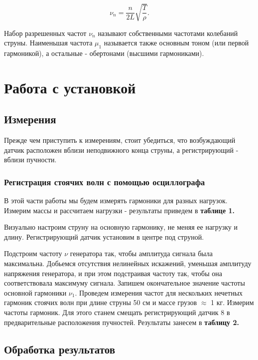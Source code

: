 \documentclass[a4paper,12pt]{report}
\begin{document}
\begin{equation} \label{chast_n}
	\nu_n=\frac{n}{2L}\sqrt{\frac{T}{\rho}}.
\end{equation}

Набор разрешенных частот $\nu_n$ называют собственными частотами колебаний струны. Наименьшая частота $\mu_1$ называется также основным тоном (или первой гармоникой), а остальные - обертонами (высшими гармониками). 

\section*{Работа с установкой}

\subsection*{Измерения}

Прежде чем приступить к измерениям, стоит убедиться, что возбуждающий датчик расположен вблизи неподвижного конца струны, а регистрирующий - вблизи пучности. 

\subsubsection*{Регистрация стоячих волн с помощью осциллографа}

В этой части работы мы будем измерять гармоники для разных нагрузок. Измерим массы и рассчитаем нагрузки - результаты приведем в \textbf{таблице 1.}

Визуально настроим струну на основную гармонику, не меняя ее нагрузку и длину. Регистрирующий датчик установим в центре под струной. 

Подстроим частоту $\nu$ генератора так, чтобы амплитуда сигнала была максимальна. Добьемся отсутствия нелинейных искажений, уменьшая амплитуду напряжения генератора, и при этом подстраивая частоту так, чтобы она соответствовала максимуму сигнала. Запишем окончательное значение частоты основной гармоники $\nu_1$. Проведем измерения частот для нескольких нечетных гармоник стоячих волн при длине струны 50 см и массе грузов $\approx$ 1 кг. Измерим частоты гармоник. Для этого станем смещать регистрирующий датчик 8 в предварительные расположения пучностей. Результаты занесем в \textbf{таблицу 2.}

\subsection*{Обработка результатов}
\end{document}
